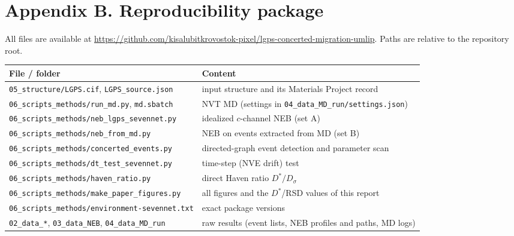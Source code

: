 \documentclass[11pt,a4paper]{article}
\begin{document}
\section*{Appendix B. Reproducibility package}
{\small All files are available at \url{https://github.com/kisalubitkrovostok-pixel/lgps-concerted-migration-umlip}. Paths are relative to the repository root.}\par\smallskip
\footnotesize
\begin{tabular}{lp{7.2cm}}
\toprule
File / folder & Content \\
\midrule
\texttt{05\_structure/LGPS.cif}, \texttt{LGPS\_source.json} & input structure and its Materials Project record \\
\texttt{06\_scripts\_methods/run\_md.py}, \texttt{md.sbatch} & NVT MD (settings in \texttt{04\_data\_MD\_run/settings.json}) \\
\texttt{06\_scripts\_methods/neb\_lgps\_sevennet.py} & idealized $c$-channel NEB (set A) \\
\texttt{06\_scripts\_methods/neb\_from\_md.py} & NEB on events extracted from MD (set B) \\
\texttt{06\_scripts\_methods/concerted\_events.py} & directed-graph event detection and parameter scan \\
\texttt{06\_scripts\_methods/dt\_test\_sevennet.py} & time-step (NVE drift) test \\
\texttt{06\_scripts\_methods/haven\_ratio.py} & direct Haven ratio $D^*/D_\sigma$ \\
\texttt{06\_scripts\_methods/make\_paper\_figures.py} & all figures and the $D^*$/RSD values of this report \\
\texttt{06\_scripts\_methods/environment-sevennet.txt} & exact package versions \\
\texttt{02\_data\_*}, \texttt{03\_data\_NEB}, \texttt{04\_data\_MD\_run} & raw results (event lists, NEB profiles and paths, MD logs) \\
\bottomrule
\end{tabular}
\end{document}

